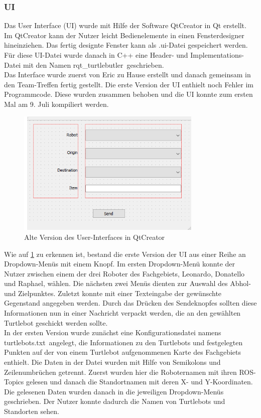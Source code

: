 \documentclass[a4paper,12pt,headsepline]{scrartcl}
\begin{document}
	\subsubsection{UI}
		Das User Interface (UI) wurde mit Hilfe der Software QtCreator in Qt erstellt. Im QtCreator kann der Nutzer leicht Bedienelemente in einen Fensterdesigner hineinziehen. Das fertig designte Fenster kann als \glqq .ui\grqq-Datei gespeichert werden. Für diese UI-Datei wurde danach in C++ eine Header- und Implementations-Datei mit den Namen \glqq rqt{\_}turtlebutler\grqq\ geschrieben.\\
		Das Interface wurde zuerst von Eric zu Hause erstellt und danach gemeinsam in den Team-Treffen fertig gestellt. Die erste Version der UI enthielt noch Fehler im Programmcode. Diese wurden zusammen behoben und die UI konnte zum ersten Mal am 9. Juli kompiliert werden.
		\begin{figure} [H]
			\centering
			\includegraphics[height=6cm]{Images/Turtlebutler_Old.png}
			\caption{Alte Version des User-Interfaces in QtCreator}
			\label{fig:OldUI}
		\end{figure}
		Wie auf \cref{fig:OldUI} zu erkennen ist, bestand die erste Version der UI aus einer Reihe an Dropdown-Menüs mit einem Knopf. Im ersten Dropdown-Menü konnte der Nutzer zwischen einem der drei Roboter des Fachgebiets, Leonardo, Donatello und Raphael, wählen. Die nächsten zwei Menüs dienten zur Auswahl des Abhol- und Zielpunktes. Zuletzt konnte mit einer Texteingabe der gewünschte Gegenstand angegeben werden. Durch das Drücken des Sendeknopfes sollten diese Informationen nun in einer Nachricht verpackt werden, die an den gewählten Turtlebot geschickt werden sollte.\\
		In der ersten Version wurde zunächst eine Konfigurationsdatei namens \glqq turtlebots.txt\grqq\ angelegt, die Informationen zu den Turtlebots und festgelegten Punkten auf der von einem Turtlebot aufgenommenen Karte des Fachgebiets enthielt. Die Daten in der Datei wurden mit Hilfe von Semikolons und Zeilenumbrüchen getrennt. Zuerst wurden hier die Roboternamen mit ihren ROS-Topics gelesen und danach die Standortnamen mit deren X- und Y-Koordinaten.  Die gelesenen Daten wurden danach in die jeweiligen Dropdown-Menüs geschrieben. Der Nutzer konnte dadurch die Namen von Turtlebots und Standorten sehen.\\
\end{document}
